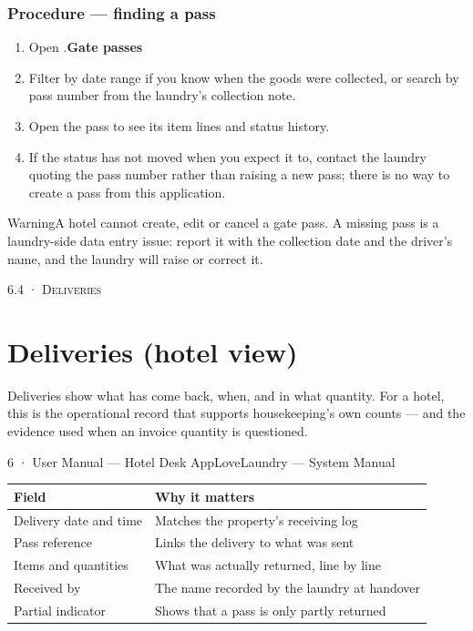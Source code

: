 \documentclass[11pt,a4paper,oneside]{book}
\begin{document}
\subsubsection*{Procedure — finding a pass}
\begin{enumerate}
\item Open .\textbf{Gate passes}
\item Filter by date range if you know when the goods were collected, or search by pass number from the laundry's collection note.
\item Open the pass to see its item lines and status history.
\item If the status has not moved when you expect it to, contact the laundry quoting the pass number rather than raising a new pass; there is no way to create a pass from this application.
\end{enumerate}
\begin{notebox}WarningA hotel cannot create, edit or cancel a gate pass. A missing pass is a laundry-side data entry issue: report it with the collection date and the driver's name, and the laundry will raise or correct it.\end{notebox}
\textsc{\small\color{crimson}6.4 · Deliveries}\par\medskip
\section*{Deliveries (hotel view)}
Deliveries show what has come back, when, and in what quantity. For a hotel, this is the operational record that supports housekeeping's own counts — and the evidence used when an invoice quantity is questioned.

6 · User Manual — Hotel Desk AppLoveLaundry — System Manual

\begin{center}\small
\begin{tabularx}{\linewidth}{|X|X|}
\hline
\rowcolor{lightgrey}
\textbf{Field} & \textbf{Why it matters} \\ \hline
Delivery date and time & Matches the property's receiving log \\ \hline
Pass reference & Links the delivery to what was sent \\ \hline
Items and quantities & What was actually returned, line by line \\ \hline
Received by & The name recorded by the laundry at handover \\ \hline
Partial indicator & Shows that a pass is only partly returned \\ \hline
\end{tabularx}
\end{center}
\end{document}
